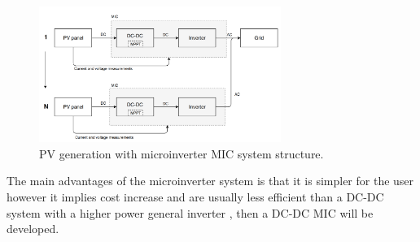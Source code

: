 \begin{figure}[htbp]
	\begin{center}
		\includegraphics[width=0.7\textwidth]{../Pictures/MIC_microinverter}
		\caption{PV generation with microinverter MIC system structure.}
		\label{microinverter_system}
	\end{center}	
\end{figure}
The main advantages of the microinverter system is that it is simpler for the user however it implies cost increase and are usually less efficient than a DC-DC system with a higher power general inverter \cite{ArchitectureMIC}, then a DC-DC MIC will be developed. 


